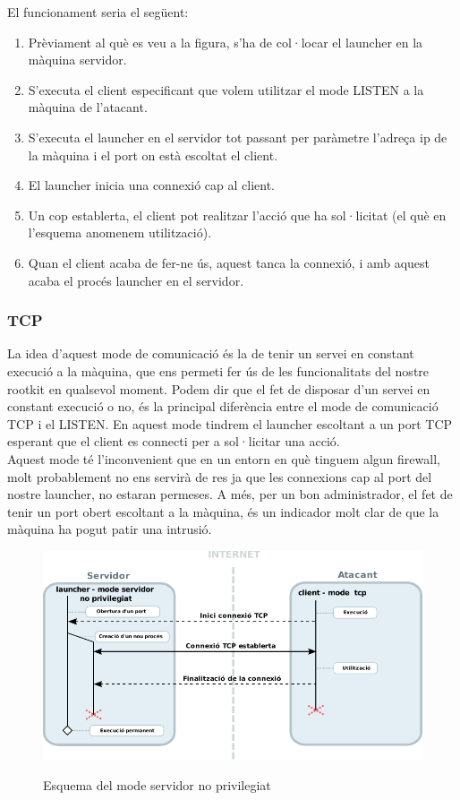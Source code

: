 El funcionament seria el següent:
\begin{enumerate}
    \item Prèviament al què es veu a la figura, s'ha de col·locar el launcher en la màquina servidor.
    \item S'executa el client especificant que volem utilitzar el mode LISTEN a la màquina de l'atacant.
    \item S'executa el launcher en el servidor tot passant per paràmetre l'adreça ip de la màquina i el port on està escoltat
        el client.
    \item El launcher inicia una connexió cap al client.
    \item Un cop establerta, el client pot realitzar l'acció que ha sol·licitat (el què en l'esquema anomenem utilització).
    \item Quan el client acaba de fer-ne ús, aquest tanca la connexió, i amb aquest acaba el procés launcher en el servidor.
\end{enumerate}

\subsubsection{TCP} \label{sec:TCP}
La idea d'aquest mode de comunicació és la de tenir un servei en constant execució a la màquina, que ens permeti
fer ús de les funcionalitats del nostre rootkit en qualsevol moment. Podem dir que el fet de disposar d'un servei en constant 
execució o no, és la principal diferència entre el mode de comunicació TCP i el LISTEN. En aquest mode tindrem el launcher 
escoltant a un port TCP esperant que el client es connecti per a sol·licitar una acció. \\

Aquest mode té l'inconvenient que en un entorn en què tinguem algun firewall, molt probablement no ens 
servirà de res ja que les connexions cap al port del nostre launcher, no estaran permeses. A més, per un bon administrador, el 
fet de tenir un port obert escoltant a la màquina, és un indicador molt clar de que la màquina ha pogut patir una intrusió. \\

\begin{figure}[htp]
    \centering
    \includegraphics[scale=1.2,keepaspectratio]{diagrames/solutionDesignUnprivilegedServerMode.pdf} \\
    \caption{Esquema del mode servidor no privilegiat}
    \label{fig:modeUnprivilegedServer}
\end{figure}

